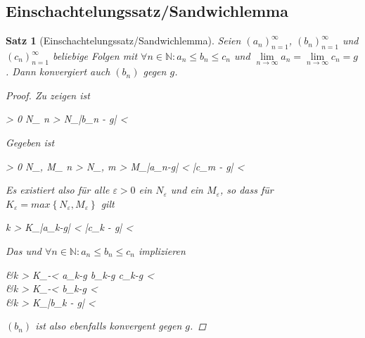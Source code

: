 \documentclass{article}
\newtheorem{thm}{Satz}[section]
\newenvironment{aleq*}{\begin{equation*}\begin{aligned}}{\end{aligned}\end{equation*}}
\begin{document}
	\subsection{Einschachtelungssatz/Sandwichlemma}
	\begin{thm}[Einschachtelungssatz/Sandwichlemma]
		Seien \((a_n)_{n=1}^\infty\), \((b_n)_{n=1}^\infty\) und \((c_n)_{n=1}^\infty\) beliebige Folgen mit \(\forall n \in \mathbb{N} \colon a_n \leq b_n \leq c_n\) und \(\lim\limits_{n \to \infty} a_n = \lim\limits_{n \to \infty} c_n = g\). Dann konvergiert auch \((b_n)\) gegen \(g\).
		
		\begin{proof}
			Zu zeigen ist
			\begin{aleq*}
				\forall \varepsilon > 0 \colon \exists N_\varepsilon \in {} \colon \forall n > N_\varepsilon \colon |b_n - g| < \varepsilon {}
			\end{aleq*}
			\par
			Gegeben ist
			\begin{aleq*}
				\label{gegebenSandwich}
				\forall \varepsilon > 0 \colon \exists N_\varepsilon, M_\varepsilon \in {} \colon \forall n > N_\varepsilon, m > M_\varepsilon \colon |a_n-g| < \varepsilon \land |c_m - g| < \varepsilon \text{.}
			\end{aleq*}
			\par
			Es existiert also für alle \(\varepsilon > 0\) ein \(N_\varepsilon\) und ein \(M_\varepsilon\), so dass für \(K_\varepsilon = max \left\lbrace N_\varepsilon, M_\varepsilon \right\rbrace\) gilt
			\begin{aleq*}
				\forall k > K_\varepsilon \colon |a_k-g| < \varepsilon \land |c_k - g| < \varepsilon {}
			\end{aleq*}
			\par
			Das und \(\forall n \in \mathbb{N} \colon a_n \leq b_n \leq c_n\) implizieren
			\begin{aleq*}
				&\forall k > K_\varepsilon \colon -\varepsilon < a_k-g \leq b_k-g \leq c_k-g < \varepsilon \\
				\implies &\forall k > K_\varepsilon \colon -\varepsilon < b_k-g < \varepsilon \\
				\iff &\forall k > K_\varepsilon \colon |b_k - g| < \varepsilon
			\end{aleq*}
			\par
			\((b_n)\) ist also ebenfalls konvergent gegen \(g\).
		\end{proof}
	\end{thm}
	
\end{document}
